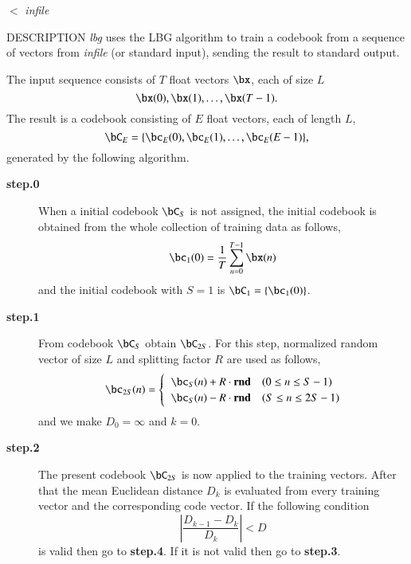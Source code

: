 \begin{synopsis}
\item [lbg] [ --l $L$ ] [ --n $N$ ] [ --t $T$ ] [ --s $S$ ] [ --e $E$ ]
        [ --f $F$ ] [ --m $M$ ] [ --d $D$ ] [ --r $R$ ] 
\item [\ ~~~~] [ {\em indexfile} ] $<$ {\em infile}
\end{synopsis}

\begin{qsection}{DESCRIPTION}
{\em lbg} uses the LBG algorithm to train a codebook 
from a sequence of vectors from {\em infile} (or standard input), 
sending the result to standard output.

The input sequence consists of $T$ float vectors $\bx$, 
each of size $L$
\begin{displaymath} 
\bx(0), \bx(1), \dots, \bx(T-1). 
\end{displaymath}
The result is a codebook consisting of $E$ float vectors, 
each of length $L$,
\begin{displaymath}
\bC_E =\{ \bc_E(0), \bc_E(1), \dots, \bc_E(E-1) \}, 
\end{displaymath}
generated by the following algorithm.

\begin{description}
\item[\bf step.0~~~]
When a initial codebook $\bC_S$ is not assigned,
the initial codebook is obtained from the whole collection of
training data as follows,
\begin{displaymath}
\bc_1(0) = \frac{1}{T} \sum_{n=0}^{T-1} \bx(n)
\end{displaymath}
and the initial codebook with $S = 1$ is $\bC_1 = \{ \bc_1(0) \}$.

\item[\bf step.1~~~]
From codebook $\bC_{S}$ obtain $\bC_{2S}$.
For this step, normalized random vector of size $L$ and splitting factor
$R$ are used as follows,
\begin{displaymath}
\bc_{2S}(n)= \begin{cases}
\;\;\bc_S(n) + R \cdot \bm{\mathrm{rnd}} & ( 0 \le n \le S-1 ) \\
\;\;\bc_S(n) - R \cdot \bm{\mathrm{rnd}} & ( S \le n \le 2S-1 )
\end{cases}
\end{displaymath}
and we make $D_0 = \infty$ and $k = 0$.

\item[\bf step.2~~~]
The present codebook $\bC_{2S}$ is now applied
to the training vectors.
After that the mean Euclidean distance $D_k$ is evaluated
from every training vector and the corresponding code vector.
If the following condition 
\begin{displaymath}
|\frac{D_{k-1}-D_{k}}{D_{k}}| < D
\end{displaymath}
is valid then go to {\bf step.4}.
If it is not valid then go to {\bf step.3}.


\end{description}
\end{qsection}
